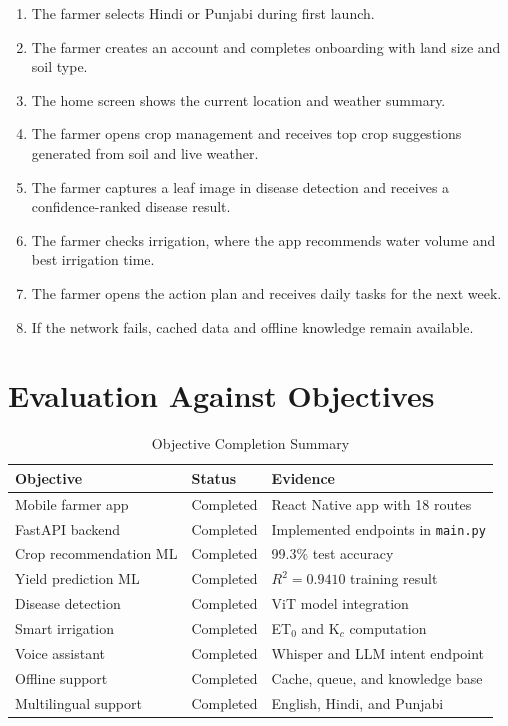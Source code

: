 \documentclass[12pt,a4paper]{report}
\begin{document}
\begin{enumerate}[leftmargin=1.5em]
  \item The farmer selects Hindi or Punjabi during first launch.
  \item The farmer creates an account and completes onboarding with land size and soil type.
  \item The home screen shows the current location and weather summary.
  \item The farmer opens crop management and receives top crop suggestions generated from soil and live weather.
  \item The farmer captures a leaf image in disease detection and receives a confidence-ranked disease result.
  \item The farmer checks irrigation, where the app recommends water volume and best irrigation time.
  \item The farmer opens the action plan and receives daily tasks for the next week.
  \item If the network fails, cached data and offline knowledge remain available.
\end{enumerate}

\section{Evaluation Against Objectives}

\begin{table}[H]
\centering
\caption{Objective Completion Summary}
\label{tab:objective_summary}
\begin{tabular}{p{7cm}p{2.4cm}p{4cm}}
\toprule
\textbf{Objective} & \textbf{Status} & \textbf{Evidence} \\
\midrule
Mobile farmer app & Completed & React Native app with 18 routes \\
FastAPI backend & Completed & Implemented endpoints in \texttt{main.py} \\
Crop recommendation ML & Completed & 99.3\% test accuracy \\
Yield prediction ML & Completed & $R^2 = 0.9410$ training result \\
Disease detection & Completed & ViT model integration \\
Smart irrigation & Completed & ET$_0$ and K$_c$ computation \\
Voice assistant & Completed & Whisper and LLM intent endpoint \\
Offline support & Completed & Cache, queue, and knowledge base \\
Multilingual support & Completed & English, Hindi, and Punjabi \\
\bottomrule
\end{tabular}
\end{table}
\end{document}
